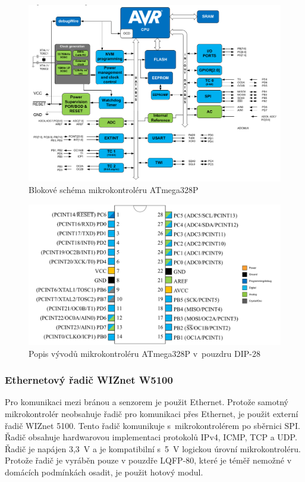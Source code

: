 \documentclass[12pt,a4paper]{article}
\begin{document}
\begin{figure}[H]
\centering
\label{fig:atmega328p-block-diagram}
\includegraphics[width = 128mm]{../img/atmega328p-block-diagram.png}
\caption{Blokové schéma mikrokontroléru ATmega328P}
\end{figure}

\begin{figure}[H]
\centering
\label{fig:atmega328p-pinout}
\includegraphics[width = 128mm]{../img/atmega328p-pinout.png}
\caption{Popis vývodů mikrokontroléru ATmega328P v~pouzdru DIP-28}
\end{figure}

\newpage

\subsubsection{Ethernetový řadič WIZnet W5100}

Pro komunikaci mezi bránou a senzorem je použit Ethernet. Protože samotný mikrokontrolér neobsahuje řadič pro komunikaci přes Ethernet, je použit externí řadič WIZnet 5100. Tento řadič komunikuje s~mikrokontrolérem po sběrnici SPI. Řadič obsahuje hardwarovou implementaci protokolů IPv4, ICMP, TCP a UDP. Řadič je napájen 3,3~V a je kompatibilní s~5~V logickou úrovní mikrokontroléru. Protože řadič je vyráběn pouze v pouzdře LQFP-80, které je téměř nemožné v domácích podmínkách osadit, je použit hotový modul.
\end{document}
